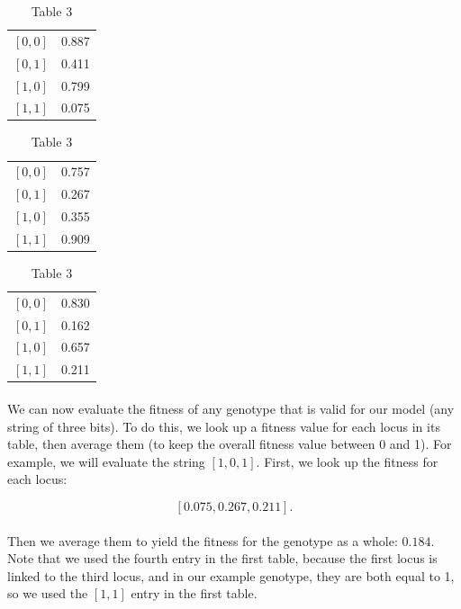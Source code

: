 \documentclass[12pt,letterpaper,titlepage]{article}
\begin{document}
\begin{table}
    \captionsetup{labelformat=empty}
    \parbox{.3\linewidth}{\centering
        \begin{tabular}{l l}
            $\left[0, 0\right]$ & 0.887 \\
            $\left[0, 1\right]$ & 0.411 \\
            $\left[1, 0\right]$ & 0.799 \\
            $\left[1, 1\right]$ & 0.075 \\
        \end{tabular}
        \caption{Table 1}
    }
    \parbox{.3\linewidth}{\centering
        \begin{tabular}{l l}
            $\left[0, 0\right]$ & 0.757 \\
            $\left[0, 1\right]$ & 0.267 \\
            $\left[1, 0\right]$ & 0.355 \\
            $\left[1, 1\right]$ & 0.909 \\
        \end{tabular}
        \caption{Table 2}
    }
    \parbox{.3\linewidth}{\centering
        \begin{tabular}{l l}
            $\left[0, 0\right]$ & 0.830 \\
            $\left[0, 1\right]$ & 0.162 \\
            $\left[1, 0\right]$ & 0.657 \\
            $\left[1, 1\right]$ & 0.211 \\
        \end{tabular}
        \caption{Table 3}
    }
\end{table}

\paragraph{}
We can now evaluate the fitness of any genotype that is valid for our model
(any string of three bits). To do this, we look up a fitness value for each
locus in its table, then average them (to keep the overall fitness value
between 0 and 1). For example, we will evaluate the string
$\left[1,0,1\right]$. First, we look up the fitness for each locus:

\begin{displaymath}
    \left[0.075, 0.267, 0.211\right].
\end{displaymath}

\paragraph{}
Then we average them to yield the fitness for the genotype as a whole: $0.184$.
Note that we used the fourth entry in the first table, because the first locus
is linked to the third locus, and in our example genotype, they are both equal
to 1, so we used the $\left[1, 1\right]$ entry in the first table.
\end{document}
